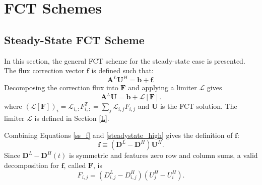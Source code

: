 \section{FCT Schemes}
\subsection{Steady-State FCT Scheme}
In this section, the general FCT scheme for the steady-state case is presented.
The flux correction vector $\mathbf{f}$ is defined such that:
\begin{equation}\label{ss_f}
   \mathbf{A}^L\mathbf{U}^H = \mathbf{b} + \mathbf{f}.
\end{equation}
Decomposing the correction flux into $\mathbf{F}$ and applying a limiter
$\mathcal{L}$ gives
\begin{equation}\label{FCT_limited_ss}
   \mathbf{A}^L\mathbf{U}
      = \mathbf{b} + \mathcal{L}[\mathbf{F}].
\end{equation}
where $(\mathcal{L}[\mathbf{F}])_i = \mathcal{L}_{i,:}F_{i,:}^T
= \sum\limits_j \mathcal{L}_{i,j}F_{i,j}$ and $\mathbf{U}$
is the FCT solution.  The limiter $\mathcal{L}$ is
defined in Section \ref{L}.

Combining Equations \eqref{ss_f} and \eqref{steadystate_high}
gives the definition of $\mathbf{f}$:
\begin{equation}
   \mathbf{f} \equiv \left(\mathbf{D}^L-\mathbf{D}^H\right)\mathbf{U}^H.
\end{equation}
Since $\mathbf{D}^L-\mathbf{D}^H(t)$ is symmetric
and features zero row and column sums, a valid decomposition for $\mathbf{f}$,
called $\mathbf{F}$, is
\begin{equation}
   F_{i,j} = \left(D_{i,j}^L-D_{i,j}^H\right)\left(U_j^H - U_i^H\right).
\end{equation}